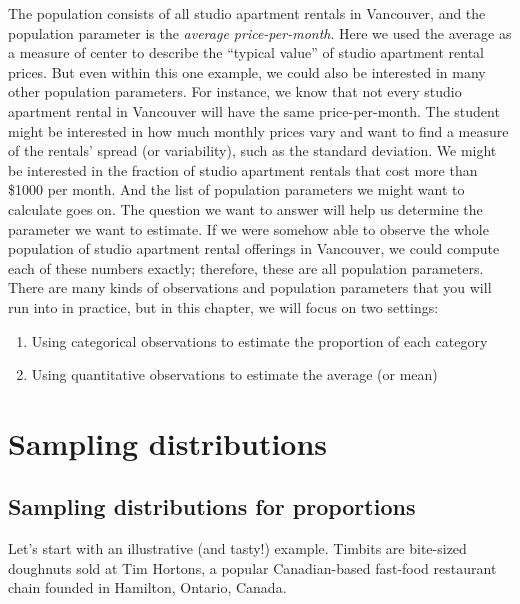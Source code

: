 \documentclass[
]{krantz}
\providecommand{\tightlist}{%
  \setlength{\itemsep}{0pt}\setlength{\parskip}{0pt}}
\begin{document}
The population consists of all studio apartment rentals in Vancouver, and the population parameter is the \emph{average price-per-month}. Here we used the average as a measure of center to describe the ``typical value'' of studio apartment rental prices. But even within this one example, we could also be interested in many other population parameters. For instance, we know that not every studio apartment rental in Vancouver will have the same price-per-month. The student might be interested in how much monthly prices vary and want to find a measure of the rentals' spread (or variability), such as the standard deviation. We might be interested in the fraction of studio apartment rentals that cost more than \$1000 per month. And the list of population parameters we might want to calculate goes on. The question we want to answer will help us determine the parameter we want to estimate. If we were somehow able to observe the whole population of studio apartment rental offerings in Vancouver, we could compute each of these numbers exactly; therefore, these are all population parameters. There are many kinds of observations and population parameters that you will run into in practice, but in this chapter, we will focus on two settings:

\begin{enumerate}
\def\labelenumi{\arabic{enumi}.}
\tightlist
\item
  Using categorical observations to estimate the proportion of each category
\item
  Using quantitative observations to estimate the average (or mean)
\end{enumerate}

\hypertarget{sampling-distributions}{%
\section{Sampling distributions}\label{sampling-distributions}}

\hypertarget{sampling-distributions-for-proportions}{%
\subsection{Sampling distributions for proportions}\label{sampling-distributions-for-proportions}}

Let's start with an illustrative (and tasty!) example. Timbits are
bite-sized doughnuts sold at Tim Hortons, a popular Canadian-based fast-food restaurant
chain founded in Hamilton, Ontario, Canada.
\end{document}
